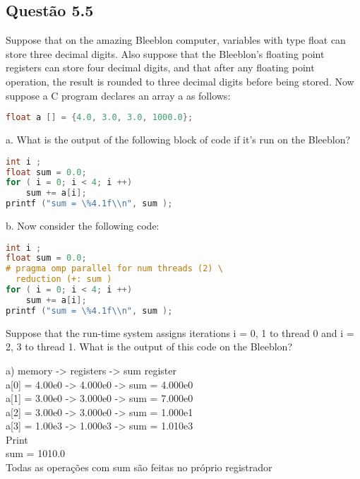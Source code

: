 
\subsection{Questão 5.5}

Suppose that on the amazing Bleeblon computer, variables with type float can store three decimal digits. Also suppose that the Bleeblon’s floating point registers can store four decimal digits, and that after any floating point operation, the result is rounded to three decimal digits before being stored. Now
suppose a C program declares an array a as follows:
\begin{lstlisting}[language=C]
float a [] = {4.0, 3.0, 3.0, 1000.0};
\end{lstlisting}

a. What is the output of the following block of code if it’s run on the Bleeblon?
\begin{lstlisting}[language=C]
int i ;
float sum = 0.0;
for ( i = 0; i < 4; i ++)
    sum += a[i];
printf ("sum = \%4.1f\\n", sum );
\end{lstlisting}


b. Now consider the following code:

\begin{lstlisting}[language=C]
int i ;
float sum = 0.0;
# pragma omp parallel for num threads (2) \
  reduction (+: sum )
for ( i = 0; i < 4; i ++)
    sum += a[i];
printf ("sum = \%4.1f\\n", sum );
\end{lstlisting}

Suppose that the run-time system assigns iterations i = 0, 1 to thread 0 and i = 2, 3 to thread 1. What is the output of this code on the Bleeblon?

a) memory -> registers -> sum register\\
a[0] = 4.00e0 -> 4.000e0 -> sum = 4.000e0\\
a[1] = 3.00e0 -> 3.000e0 -> sum = 7.000e0\\
a[2] = 3.00e0 -> 3.000e0 -> sum = 1.000e1\\
a[3] = 1.00e3 -> 1.000e3 -> sum = 1.010e3\\

Print \\
sum = 1010.0\\

Todas as operações com sum são feitas no próprio registrador\\

